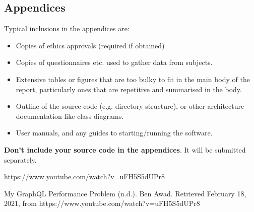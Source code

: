 \documentclass{l4proj}
\begin{document}
%
% 

\begin{appendices}

\chapter{Appendices}

Typical inclusions in the appendices are:

\begin{itemize}
\item
  Copies of ethics approvals (required if obtained)
\item
  Copies of questionnaires etc. used to gather data from subjects.
\item
  Extensive tables or figures that are too bulky to fit in the main body of
  the report, particularly ones that are repetitive and summarised in the body.

\item Outline of the source code (e.g. directory structure), or other architecture documentation like class diagrams.

\item User manuals, and any guides to starting/running the software.

\end{itemize}

\textbf{Don't include your source code in the appendices}. It will be
submitted separately.

\end{appendices}




https://www.youtube.com/watch?v=uFH5S5dUPr8



My GraphQL Performance Problem (n.d.). Ben Awad. Retrieved February 18, 2021, from https://www.youtube.com/watch?v=uFH5S5dUPr8
\end{document}
